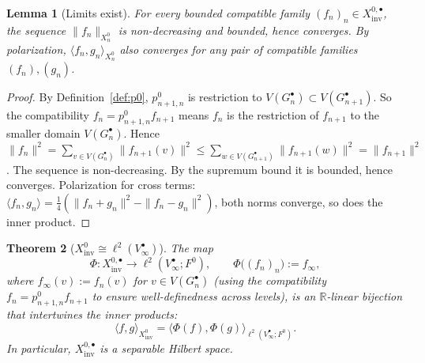 \documentclass[11pt, a4paper]{amsart}
\newtheorem{theorem}{Theorem}[section]
\newtheorem{lemma}[theorem]{Lemma}
\theoremstyle{definition}
\newcommand{\R}{\mathbb{R}}
\newcommand{\inv}{\mathrm{inv}}
\begin{document}
\begin{lemma}[Limits exist]
\label{lem:Xinv-limit-exists}
For every bounded compatible family $(f_n)_n \in X_\inv^{0, \bullet}$,
the sequence $\|f_n\|_{X_n^0}$ is non-decreasing and bounded, hence
converges. By polarization, $\langle f_n, g_n \rangle_{X_n^0}$
also converges for any pair of compatible families $(f_n), (g_n)$.
\end{lemma}

\begin{proof}
By Definition~\ref{def:p0}, $p_{n+1, n}^0$ is restriction to
$V(G_n^\bullet) \subset V(G_{n+1}^\bullet)$. So the compatibility
$f_n = p_{n+1, n}^0 f_{n+1}$ means $f_n$ is the restriction of
$f_{n+1}$ to the smaller domain $V(G_n^\bullet)$. Hence
$\|f_n\|^2 = \sum_{v \in V(G_n^\bullet)} \|f_{n+1}(v)\|^2 \leq
\sum_{w \in V(G_{n+1}^\bullet)} \|f_{n+1}(w)\|^2 = \|f_{n+1}\|^2$.
The sequence is non-decreasing. By the supremum bound it is
bounded, hence converges. Polarization for cross terms:
$\langle f_n, g_n \rangle = \tfrac{1}{4}(\|f_n + g_n\|^2 -
\|f_n - g_n\|^2)$, both norms converge, so does the inner product.
\end{proof}

\begin{theorem}[$X_\inv^0 \cong \ell^2(V_\infty^\bullet)$]
\label{thm:Xinv-Hilbert}
The map
\[
  \Phi \colon X_\inv^{0, \bullet} \to \ell^2(V_\infty^\bullet;
    F^0), \qquad
  \Phi\bigl((f_n)_n\bigr) := f_\infty,
\]
where $f_\infty(v) := f_n(v)$ for $v \in V(G_n^\bullet)$ (using
the compatibility $f_n = p_{n+1, n}^0 f_{n+1}$ to ensure
well-definedness across levels), is an $\R$-linear bijection that
intertwines the inner products:
\[
  \langle f, g \rangle_{X_\inv^0} = \langle \Phi(f), \Phi(g)
    \rangle_{\ell^2(V_\infty^\bullet; F^0)}.
\]
In particular, $X_\inv^{0, \bullet}$ is a separable Hilbert space.
\end{theorem}
\end{document}
